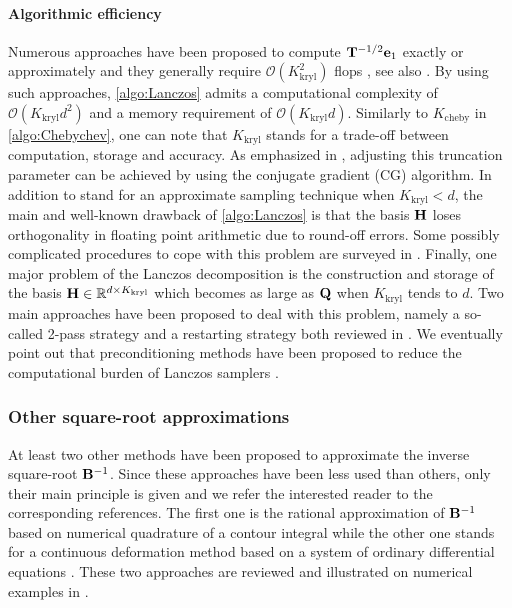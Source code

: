 \documentclass[nohypdvips,onefignum,onetabnum]{siamart171218}
\begin{document}
\paragraph{Algorithmic efficiency}
Numerous approaches have been proposed to compute $\mathbf{T}^{-1/2}\mathbf{e}_1$ exactly or approximately and they generally require $\mathcal{O}(K_{\mathrm{kryl}}^2)$ flops \cite{tridiag1,tridiag2}, see also .
By using such approaches, \cref{algo:Lanczos} admits a computational complexity of $\mathcal{O}(K_{\mathrm{kryl}}d^2)$ and a memory requirement of $\mathcal{O}(K_{\mathrm{kryl}}d)$.
Similarly to $K_{\mathrm{cheby}}$ in \cref{algo:Chebychev}, one can note that $K_{\mathrm{kryl}}$ stands for a trade-off between computation, storage and accuracy.
As emphasized in \cite{Aune2013, Simpson2008}, adjusting this truncation parameter can be achieved by using the conjugate gradient (CG) algorithm.
In addition to stand for an approximate sampling technique when $K_{\mathrm{kryl}}<d$, the main and well-known drawback of \cref{algo:Lanczos} is that the basis $\mathbf{H}$ loses orthogonality in floating point arithmetic due to round-off errors.
Some possibly complicated procedures to cope with this problem are surveyed in \cite{Stewart2001}.
Finally, one major problem of the Lanczos decomposition is the construction and storage of the basis $\mathbf{H} \in \mathbb{R}^{d \times K_{\mathrm{kryl}}}$ which becomes as large as $\mathbf{Q}$ when $K_{\mathrm{kryl}}$ tends to $d$.
Two main approaches have been proposed to deal with this problem, namely a so-called 2-pass strategy and a restarting strategy both reviewed in \cite{Aune2013,Ilic2009, Simpson2008}.
We eventually point out that preconditioning methods have been proposed to reduce the computational burden of Lanczos samplers \cite{Chow2014}.


\subsubsection{Other square-root approximations}
At least two other methods have been proposed to approximate the inverse square-root $\mathbf{B}^{-1}$.
Since these approaches have been less used than others, only their main principle is given and we refer the interested reader to the corresponding references.
The first one is the rational approximation of $\mathbf{B}^{-1}$ based on numerical quadrature of a contour integral \cite{Hale2008b} while the other one stands for a continuous deformation method based on a system of ordinary differential equations \cite{Allen2000}.
These two approaches are reviewed and illustrated on numerical examples in \cite{Aune2013}.
\end{document}
